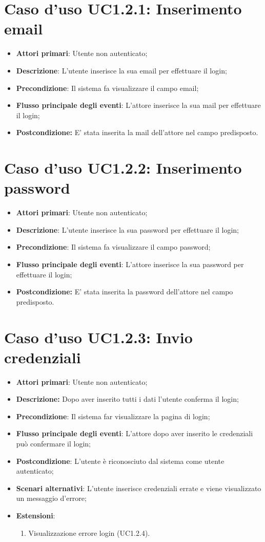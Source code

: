 			
\section{Caso d'uso UC1.2.1: Inserimento email}
\begin{itemize}
	\item \textbf{Attori primari}: Utente non autenticato;
	\item \textbf{Descrizione}: L'utente inserisce la sua email per effettuare il login;
	\item \textbf{Precondizione}: Il sistema fa visualizzare il campo email;
	\item \textbf{Flusso principale degli eventi}: L'attore inserisce la sua mail per effettuare il login;
	\item \textbf{Postcondizione:} E' stata inserita la mail dell'attore nel campo predisposto. 
\end{itemize}

\section{Caso d'uso UC1.2.2: Inserimento password}
	\begin{itemize}
		\item \textbf{Attori primari}: Utente non autenticato;
		\item \textbf{Descrizione}: L'utente inserisce la sua password per effettuare il login;
		\item \textbf{Precondizione}: Il sistema fa visualizzare il campo password;
		\item \textbf{Flusso principale degli eventi}: L'attore inserisce la sua password per effettuare il login;
		\item \textbf{Postcondizione:} E' stata inserita la password dell'attore nel campo predisposto. 
	\end{itemize}
	\section{Caso d'uso UC1.2.3: Invio credenziali}
	\begin{itemize}
		\item \textbf{Attori primari}: Utente non autenticato;
		\item \textbf{Descrizione:} Dopo aver inserito tutti i dati l'utente conferma il login;
		\item \textbf{Precondizione}: Il sistema far visualizzare la pagina di login;
		\item \textbf{Flusso principale degli eventi}: L'attore dopo aver inserito le credenziali può confermare il login;
		\item \textbf{Postcondizione}: L'utente è riconosciuto dal sistema come utente autenticato;
		\item \textbf{Scenari alternativi}: L'utente inserisce credenziali errate e viene visualizzato un messaggio d'errore;
		\item \textbf{Estensioni}:
		\begin{enumerate}
			\item Visualizzazione errore login (UC1.2.4).
		\end{enumerate} 
	\end{itemize}

